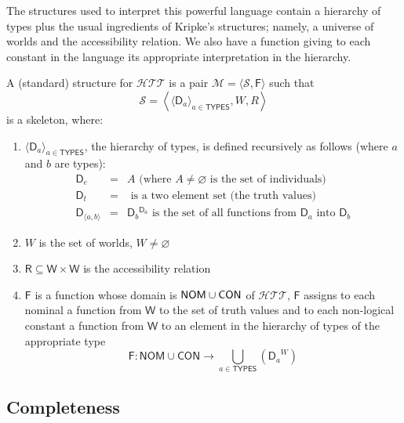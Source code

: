 The structures used to interpret this powerful language contain a hierarchy
of types plus the usual ingredients of Kripke's structures; namely, a
universe of worlds and the accessibility relation. We also have a function
giving to each constant in the language its appropriate interpretation in the
hierarchy.

\begin{definition}
A (standard) structure for $\mathcal{HTT}$ is a pair 
$\mathcal{M}=\langle \mathcal{S},\mathsf{F}\rangle $ such that%
$$
\mathcal{S}=\left\langle \langle \mathsf{D}_{a}\rangle _{a\in \mathsf{TYPES}%
},W,R\right\rangle
$$
is a skeleton, where:

\begin{enumerate}
\item $\langle \mathsf{D}_{a}\rangle _{a\in \mathsf{TYPES}}$, the hierarchy
of types, is defined recursively as follows (where $a$ and $b$ are types):%
$$
\begin{array}{rcl}
\mathsf{D}_{e} & = & A\text{ (where }A\not=\varnothing \text{ is the set of
individuals)} \\ 
\mathsf{D}_{t} & = & \text{ is a two element set (the truth values)} \\ 
\mathsf{D}_{\langle a,b\rangle } & = & \mathsf{D}_{b}{}^{\mathsf{D}_{a}}%
\text{ is the set of all functions from }\mathsf{D}_{a}\text{ into }\mathsf{D%
}_{b}%
\end{array}%
$$

\item $W$ is the set of worlds, $W\not=\varnothing $

\item $\mathsf{R}\subseteq \mathsf{W}\times \mathsf{W}$ is the accessibility
relation

\item $\mathsf{F}$ is a function whose domain is $\mathsf{NOM}\cup \mathsf{%
CON}$ of $\mathcal{HTT}$, $\mathsf{F}$ assigns to each nominal a function
from $\mathsf{W}$ to the set of truth values and to each non-logical
constant a function from $\mathsf{W}$ to an element in the hierarchy of
types of the appropriate type 
$$
\mathsf{F}:\mathsf{NOM}\cup \mathsf{CON}\longrightarrow \bigcup\limits_{a\in 
\mathsf{TYPES}}\left( \left. \mathsf{D}_{a}\right. ^{W}\right)
$$
\end{enumerate}
\end{definition}

\subsection{Completeness}

